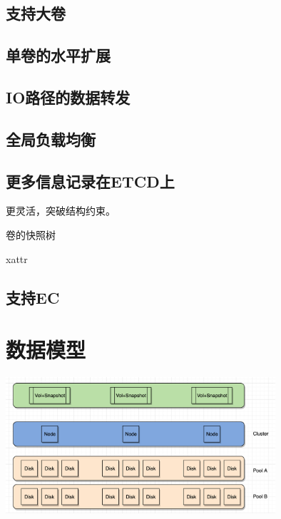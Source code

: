 \subsection{支持大卷}

\subsection{单卷的水平扩展}

\subsection{IO路径的数据转发}

\subsection{全局负载均衡}

\subsection{更多信息记录在ETCD上}

更灵活，突破结构约束。

\begin{enumbox}
\item 卷的快照树
\item xattr
\end{enumbox}

\subsection{支持EC}

\section{数据模型}

\begin{center}
\includegraphics[width=10cm]{../imgs/cluster-virt.png}
\end{center}


